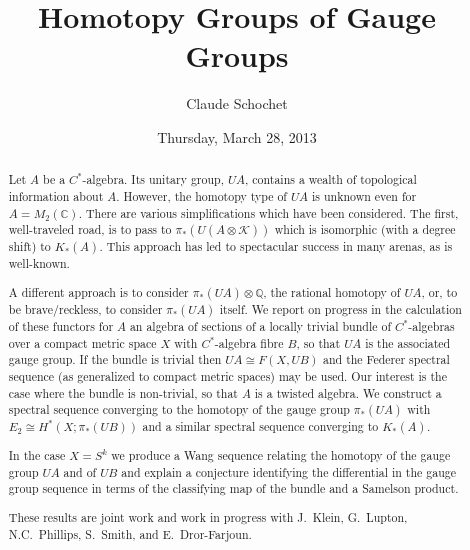 \documentclass{UAmathtalk}
\author{Claude Schochet}
\title{Homotopy Groups of Gauge Groups}
\date{Thursday, March 28, 2013}
\newcommand{\CC}{{\mathbb{C}}}
\newcommand{\QQ}{{\mathbb{Q}}}
\newcommand{\KK}{{\mathcal{K}}}
\begin{document}
\maketitle

\begin{abstract}
Let $A$ be a $C^*$-algebra. Its unitary group, $UA$, contains a wealth of topological information about $A$. However, the homotopy type of $UA$ is unknown even for $A = M_2(\CC)$.  There are various simplifications which have been considered. The first, well-traveled road, is to pass to $\pi_*(U(A\otimes \KK ))$ which is isomorphic (with a degree shift) to $K_*(A)$. This approach has led to spectacular success in many arenas, as is well-known.

A different approach is to consider $\pi _*(UA)\otimes\QQ$, the rational homotopy of $UA$, or, to be brave/reckless, to consider $\pi _*(UA)$ itself. We report on progress in the calculation of these functors for $A$ an algebra of sections of a locally trivial bundle of $C^*$-algebras over a compact metric space $X$ with $C^*$-algebra fibre $B$, so that $UA$ is the associated gauge group.  If the bundle is trivial then $UA \cong F(X, UB)$ and the Federer spectral sequence (as generalized to compact metric spaces) may be used. Our interest is the case where the bundle is non-trivial, so that $A$ is a twisted algebra. We construct a spectral sequence converging to the homotopy of the gauge group $\pi _* (UA)$ with $E_2 \cong H^*(X; \pi _* (UB))$ and a similar spectral sequence converging to $K_*(A)$.

In the case $X = S^k$ we produce a Wang sequence relating the homotopy of the gauge group $UA$ and of $UB$ and explain a conjecture identifying the differential in the gauge group sequence in terms of the classifying map of the bundle and a Samelson product.

These results are joint work and work in progress with J.~Klein, G.~Lupton, N.C.~Phillips, S.~Smith, and E.~Dror-Farjoun.
\end{abstract}
\end{document}
